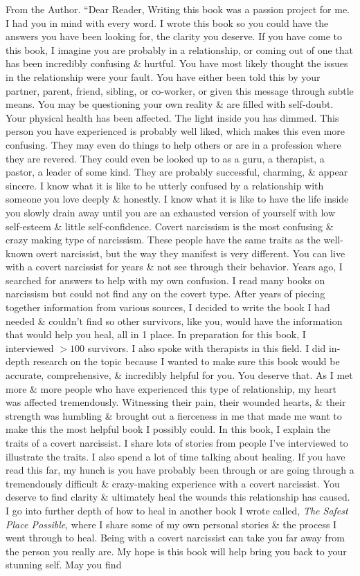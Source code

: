 \documentclass{article}
\begin{document}
\begin{enumerate}
	{\sf From the Author.} ``Dear Reader, Writing this book was a passion project for me. I had you in mind with every word. I wrote this book so you could have the answers you have been looking for, the clarity you deserve. If you have come to this book, I imagine you are probably in a relationship, or coming out of one that has been incredibly confusing \& hurtful. You have most likely thought the issues in the relationship were your fault. You have either been told this by your partner, parent, friend, sibling, or co-worker, or given this message through subtle means. You may be questioning your own reality \& are filled with self-doubt. Your physical health has been affected. The light inside you has dimmed. This person you have experienced is probably well liked, which makes this even more confusing. They may even do things to help others or are in a profession where they are revered. They could even be looked up to as a guru, a therapist, a pastor, a leader of some kind. They are probably successful, charming, \& appear sincere. I know what it is like to be utterly confused by a relationship with someone you love deeply \& honestly. I know what it is like to have the life inside you slowly drain away until you are an exhausted version of yourself with low self-esteem \& little self-confidence. Covert narcissism is the most confusing \& crazy making type of narcissism. These people have the same traits as the well-known overt narcissist, but the way they manifest is very different. You can live with a covert narcissist for years \& not see through their behavior. Years ago, I searched for answers to help with my own confusion. I read many books on narcissism but could not find any on the covert type. After years of piecing together information from various sources, I decided to write the book I had needed \& couldn't find so other survivors, like you, would have the information that would help you heal, all in 1 place. In preparation for this book, I interviewed $> 100$ survivors. I also spoke with therapists in this field. I did in-depth research on the topic because I wanted to make sure this book would be accurate, comprehensive, \& incredibly helpful for you. You deserve that. As I met more \& more people who have experienced this type of relationship, my heart was affected tremendously. Witnessing their pain, their wounded hearts, \& their strength was humbling \& brought out a fierceness in me that made me want to make this the most helpful book I possibly could. In this book, I explain the traits of a covert narcissist. I share lots of stories from people I've interviewed to illustrate the traits. I also spend a lot of time talking about healing. If you have read this far, my hunch is you have probably been through or are going through a tremendously difficult \& crazy-making experience with a covert narcissist. You deserve to find clarity \& ultimately heal the wounds this relationship has caused. I go into further depth of how to heal in another book I wrote called, {\it The Safest Place Possible}, where I share some of my own personal stories \& the process I went through to heal. Being with a covert narcissist can take you far away from the person you really are. My hope is this book will help bring you back to your stunning self. May you find 
\end{enumerate}
\end{document}
